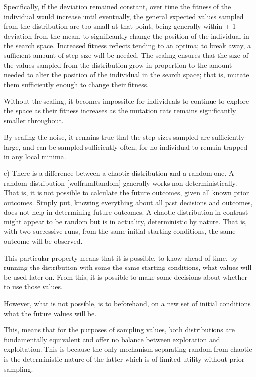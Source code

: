 \documentclass[12pt]{article}
\begin{document}
	Specifically, if the deviation remained constant, over time the fitness of the individual would increase until eventually, the general expected values sampled from the distribution are too small at that point, being generally within +-1 deviation from the mean, to significantly change the position of the individual in the search space. Increased fitness reflects tending to an optima; to break away, a sufficient amount of step size will be needed. The scaling ensures that the size of the values sampled from the distribution grow in proportion to the amount needed to alter the position of the individual in the search space; that is, mutate them sufficiently enough to change their fitness. 

	Without the scaling, it becomes impossible for individuals to continue to explore the space as their fitness increases as the mutation rate remains significantly smaller throughout. 

	By scaling the noise, it remains true that the step sizes sampled are sufficiently large, and can be sampled sufficiently often, for no individual to remain trapped in any local minima.
	
	c) There is a difference between a chaotic distribution and a random one. A random distribution [wolframRandom] generally works non-deterministically. That is, it is not possible to calculate the future outcomes, given all known prior outcomes. Simply put, knowing everything about all past decisions and outcomes, does not help in determining future outcomes. A chaotic distribution \cite{smith_1992} in contrast might appear to be random but is in actuality, deterministic by nature. That is, with two successive runs, from the same initial starting conditions, the same outcome will be observed.

	This particular property means that it is possible, to know ahead of time, by running the distribution with some the same starting conditions, what values will be used later on. From this, it is possible to make some decisions about whether to use those values. 

	However, what is not possible, is to beforehand, on a new set of initial conditions what the future values will be.

	This, means that for the purposes of sampling values, both distributions are fundamentally equivalent and offer no balance between exploration and exploitation. This is because the only mechanism separating random from chaotic is the deterministic nature of the latter which is of limited utility without prior sampling. 
\end{document}
